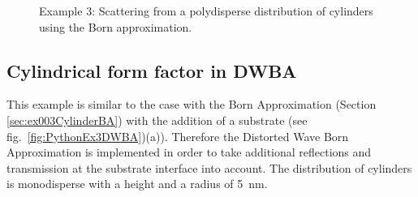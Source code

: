 \begin{figure}[H]
\hfill
{}
\hfill
{}
\hfill
\caption{Example 3: Scattering from a polydisperse distribution of cylinders using the Born approximation.}
\label{fig:PythonEx3BASize}
\end{figure}




\subsection{Cylindrical form factor in DWBA} \label{sec:ex003CylinderDWBA}
This example is similar to the case with  the Born Approximation (Section \ref{sec:ex003CylinderBA}) with the addition of a substrate (see fig.~\ref{fig:PythonEx3DWBA})(a)). Therefore the Distorted Wave Born Approximation is implemented in order to take additional reflections and transmission at the substrate interface into account.
The distribution of cylinders is monodisperse with a height and a radius of 5~nm.

